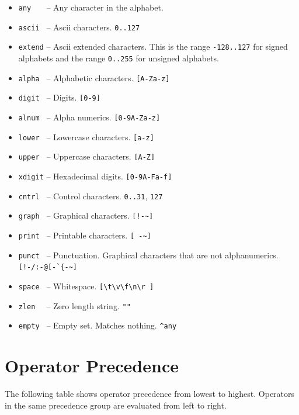 \documentclass[letterpaper,11pt,oneside]{book}
\begin{document}
\begin{itemize}
\begin{itemize}
\item \verb|any   | -- Any character in the alphabet.

\item \verb|ascii | -- Ascii characters. \verb|0..127|

\item \verb|extend| -- Ascii extended characters. This is the range
\verb|-128..127| for signed alphabets and the range \verb|0..255| for unsigned
alphabets.

\item \verb|alpha | -- Alphabetic characters. \verb|[A-Za-z]|

\item \verb|digit | -- Digits. \verb|[0-9]|

\item \verb|alnum | -- Alpha numerics. \verb|[0-9A-Za-z]|

\item \verb|lower | -- Lowercase characters. \verb|[a-z]|

\item \verb|upper | -- Uppercase characters. \verb|[A-Z]|

\item \verb|xdigit| -- Hexadecimal digits. \verb|[0-9A-Fa-f]|

\item \verb|cntrl | -- Control characters. \verb|0..31|, \verb|127|

\item \verb|graph | -- Graphical characters. \verb|[!-~]|

\item \verb|print | -- Printable characters. \verb|[ -~]|

\item \verb|punct | -- Punctuation. Graphical characters that are not alphanumerics.
\verb|[!-/:-@[-`{-~]|

\item \verb|space | -- Whitespace. \verb|[\t\v\f\n\r ]|

\item \verb|zlen  | -- Zero length string. \verb|""|

\item \verb|empty | -- Empty set. Matches nothing. \verb|^any|

\end{itemize}
\end{itemize}

\section{Operator Precedence}
The following table shows operator precedence from lowest to highest. Operators
in the same precedence group are evaluated from left to right.
\end{document}
